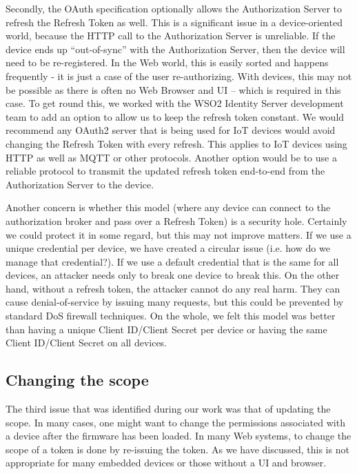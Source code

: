 \documentclass{llncs}
\begin{document}
Secondly, the OAuth specification optionally allows the Authorization Server to refresh the Refresh Token as well. 
This is a significant issue in a device-oriented world, because the HTTP call to the Authorization Server is unreliable.
If the device ends up ``out-of-sync'' with the Authorization Server, then the device will need to be re-registered.  In the Web world, this is easily sorted and happens
frequently - it is just a case of the user re-authorizing. 
With devices, this may not be possible as there is often no Web Browser and UI -- which is required in this case.
To get round this, we worked with the WSO2 Identity Server development team
to add an option to allow us to keep the refresh token constant. We would recommend any OAuth2 server that is being used for IoT devices would avoid changing the 
Refresh Token with every refresh. This applies to IoT devices using HTTP as well as MQTT or other protocols. Another option would be to use a reliable protocol to transmit the updated refresh token end-to-end from the Authorization Server to the device.

Another concern is whether this model (where any device can connect to the authorization broker and pass over a Refresh Token) is a security
hole. Certainly we could protect it in some regard, but this may not improve matters. If we use a unique credential per device, we have created a circular issue (i.e. how do we manage that credential?). 
If we use a default credential that is the same for all devices, an attacker needs only to break one device to break this.
On the other hand, without a refresh token, the attacker cannot do any real harm. They can cause denial-of-service by issuing 
many requests, but this could be prevented by standard DoS firewall techniques. On the whole, we felt this model was better than 
having a unique Client ID/Client Secret per device or having the same Client ID/Client Secret on all devices.

\subsection{Changing the scope}
The third issue that was identified during our work was that of updating the scope.
In many cases, one might want to change the permissions associated with a device after the firmware
has been loaded. In many Web systems, to change the scope of a token is done by re-issuing the token. As we have discussed, this is not appropriate for many embedded devices or those without a UI and browser. 
\end{document}
